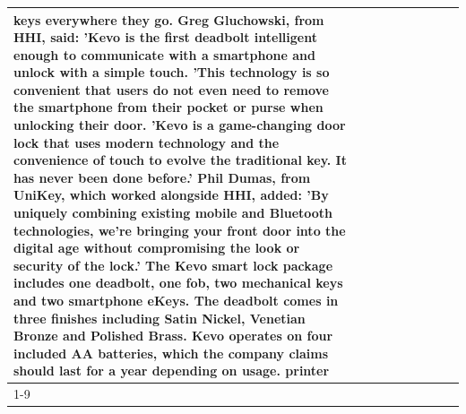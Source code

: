 \begin{table}[H]
\begin{tabular}{lllrlllll}
keys everywhere they go. Greg Gluchowski, from HHI, said: 'Kevo is the first deadbolt intelligent enough to communicate with a smartphone and unlock with a simple touch. 'This technology is so convenient that users do not even need to remove the smartphone from their pocket or purse when unlocking their door. 'Kevo is a game-changing door lock that uses modern technology and the convenience of touch to evolve the traditional key. It has never been done before.' Phil Dumas, from UniKey, which worked alongside HHI, added: 'By uniquely combining existing mobile and Bluetooth technologies, we’re bringing your front door into the digital age without compromising the look or security of the lock.' The Kevo smart lock package includes one deadbolt, one fob, two mechanical keys and two smartphone eKeys. The deadbolt comes in three finishes including Satin Nickel, Venetian Bronze and Polished Brass. Kevo operates on four included AA batteries, which the company claims should last for a year depending on usage. printer \\
\cline{1-9}

\end{tabular}
\end{table}
